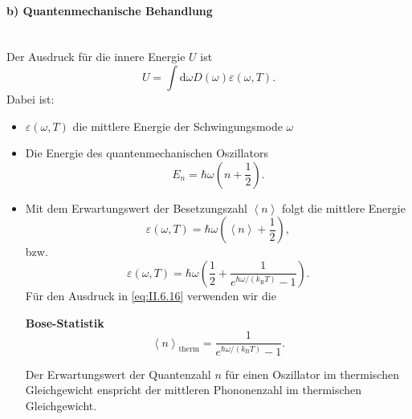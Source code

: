 \paragraph{b) Quantenmechanische Behandlung}\,\\
	Der Ausdruck für die innere Energie $U$ ist
	\begin{equation}
		\label{eq:II.6.11}
		U = \int \mathrm{d} \omega D(\omega) \varepsilon(\omega,T).
	\end{equation}
	Dabei ist:
	\begin{itemize}
		\item $\varepsilon(\omega,T)$ die mittlere Energie der Schwingungsmode $\omega$ 
		\item Die Energie des quantenmechanischen Oszillators 
			$$
			E_{n} = \hbar \omega\left( n + \frac{1}{2} \right).
			$$ 
		\item Mit dem Erwartungswert der Besetzungszahl $\left<n \right>$ folgt die mittlere Energie
			\begin{equation}
				\label{eq:II.6.12}
				\varepsilon(\omega,T) = \hbar \omega\left( \left<n \right> + \frac{1}{2} \right),
			\end{equation}
			bzw.
			\setcounter{equation}{15}
			\begin{equation}
				\label{eq:II.6.16}
				\varepsilon(\omega,T) = \hbar \omega \left( \frac{1}{2} + \frac{1}{e^{\hbar \omega / (k_{\mathrm{B}} T)}-1} \right).
			\end{equation}
			Für den Ausdruck in \eqref{eq:II.6.16} verwenden wir die
			\begin{important}
				\textbf{Bose-Statistik}
				\begin{equation}
					\label{}
					\left<n \right>_{\text{therm}} = \frac{1}{e^{\hbar \omega / (k_{\mathrm{B}}T) } - 1}.
				\end{equation}
			\end{important}
			
			Der Erwartungswert der Quantenzahl $n$ für einen Oszillator im thermischen Gleichgewicht enspricht der mittleren Phononenzahl im thermischen Gleichgewicht.
	\end{itemize}
